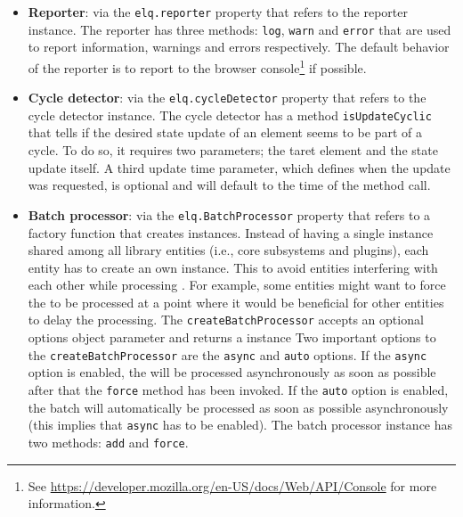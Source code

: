 \documentclass[a4paper,11pt]{kth-mag}
\newcommand{\code}[1]{\texttt{#1}}
\begin{document}
        \begin{itemize}
          \item 
            \textbf{Reporter}: via the \code{elq.reporter} property that refers to the reporter instance.
            The reporter has three methods: \code{log}, \code{warn} and \code{error} that are used to report information, warnings and errors respectively.
            The default behavior of the reporter is to report to the browser console\footnote{See \url{https://developer.mozilla.org/en-US/docs/Web/API/Console} for more information.} if possible.
          \item
            \textbf{Cycle detector}: via the \code{elq.cycleDetector} property that refers to the cycle detector instance.
            The cycle detector has a method \code{isUpdateCyclic} that tells if the desired state update of an element seems to be part of a cycle.
            To do so, it requires two parameters; the taret element and the state update itself.
            A third update time parameter, which defines when the update was requested, is optional and will default to the time of the method call.
          \item 
            \textbf{Batch processor}: via the \code{elq.BatchProcessor} property that refers to a factory function that creates  instances.
            Instead of having a single  instance shared among all library entities (i.e., core subsystems and plugins), each entity has to create an own instance.
            This to avoid entities interfering with each other while processing .
            For example, some entities might want to force the  to be processed at a point where it would be beneficial for other entities to delay the processing.
            The \code{createBatchProcessor} accepts an optional options object parameter and returns a  instance
            Two important options to the \code{createBatchProcessor} are the \code{async} and \code{auto} options.
            If the \code{async} option is enabled, the  will be processed asynchronously as soon as possible after that the \code{force} method has been invoked.
            If the \code{auto} option is enabled, the batch will automatically be processed as soon as possible asynchronously (this implies that \code{async} has to be enabled).
            The batch processor instance has two methods: \code{add} and \code{force}.

\end{itemize}
\end{document}
